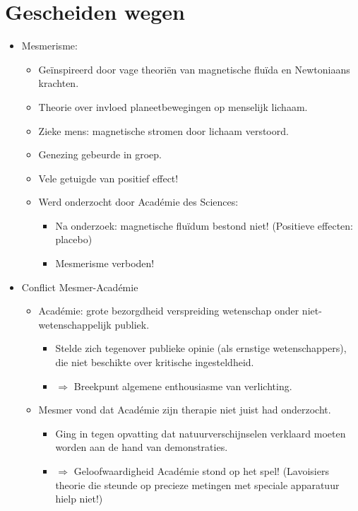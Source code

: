 \documentclass{article}
\begin{document}
  \section{Gescheiden wegen}
    \begin{itemize}
      \item Mesmerisme:
      \begin{itemize}
        \item Ge\"inspireerd door vage theori\"en van magnetische flu\"ida en Newtoniaans krachten.
        \item Theorie over invloed planeetbewegingen op menselijk lichaam.
        \item Zieke mens: magnetische stromen door lichaam verstoord.
        \item Genezing gebeurde in groep.
        \item Vele getuigde van positief effect!
        \item Werd onderzocht door Acad\'emie des Sciences:
        \begin{itemize}
          \item Na onderzoek: magnetische flu\"idum bestond niet! (Positieve effecten: placebo)
          \item Mesmerisme verboden!
        \end{itemize}
      \end{itemize}
      \item Conflict Mesmer-Acad\'emie
      \begin{itemize}
        \item Acad\'emie: grote bezorgdheid verspreiding wetenschap onder niet-wetenschappelijk publiek.
        \begin{itemize}
          \item Stelde zich tegenover publieke opinie (als ernstige wetenschappers), die niet beschikte over kritische ingesteldheid.
          \item $\Rightarrow$ Breekpunt algemene enthousiasme van verlichting. 
        \end{itemize}
        \item Mesmer vond dat Acad\'emie zijn therapie niet juist had onderzocht.
        \begin{itemize}
          \item Ging in tegen opvatting dat natuurverschijnselen verklaard moeten worden aan de hand van demonstraties.
          \item $\Rightarrow$ Geloofwaardigheid Acad\'emie stond op het spel! (Lavoisiers theorie die steunde op precieze metingen met speciale apparatuur hielp niet!)

\end{itemize}
\end{itemize}
\end{itemize}
\end{document}
